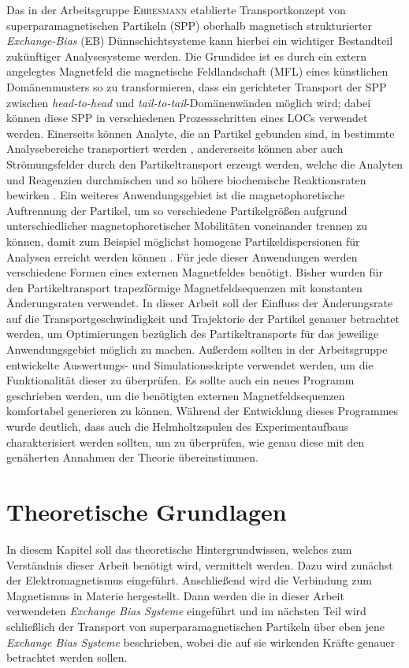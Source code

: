 \documentclass[page,pdftex,12pt,a4paper,twoside,openright]{scrbook}
\begin{document}
Das in der Arbeitsgruppe \textsc{Ehresmann} etablierte Transportkonzept von superparamagnetischen Partikeln (SPP) oberhalb magnetisch strukturierter \emph{Exchange-Bias} (EB) Dünnschichtsysteme kann hierbei ein wichtiger Bestandteil zukünftiger Analysesysteme werden. Die Grundidee ist es durch ein extern angelegtes Magnetfeld die magnetische Feldlandschaft (MFL) eines künstlichen Domänenmusters so zu transformieren, dass ein gerichteter Transport der SPP zwischen \emph{head-to-head} und \emph{tail-to-tail}-Domänenwänden möglich wird; dabei können diese SPP in verschiedenen Prozessschritten eines LOCs verwendet werden. Einerseits können Analyte, die an Partikel gebunden sind, in bestimmte Analysebereiche transportiert werden \cite{ehresmann_asymmetric_2011}, andererseits können aber auch Strömungsfelder durch den Partikeltransport erzeugt werden, welche die Analyten und Reagenzien durchmischen und so höhere biochemische Reaktionsraten bewirken \cite{holzinger_controlled_2012}. Ein weiteres Anwendungsgebiet ist die magnetophoretische Auftrennung der Partikel, um so verschiedene Partikelgrößen aufgrund unterschiedlicher magnetophoretischer Mobilitäten voneinander trennen zu können, damit zum Beispiel möglichst homogene Partikeldispersionen für Analysen erreicht werden können \cite{zhou_magnetic_2016}. Für jede dieser Anwendungen werden verschiedene Formen eines externen Magnetfeldes benötigt. Bisher wurden für den Partikeltransport trapezförmige Magnetfeldsequenzen mit konstanten Änderungsraten verwendet. In dieser Arbeit soll der Einfluss der Änderungsrate auf die Transportgeschwindigkeit und Trajektorie der Partikel genauer betrachtet werden, um Optimierungen bezüglich des Partikeltransports für das jeweilige Anwendungsgebiet möglich zu machen.
Außerdem sollten in der Arbeitsgruppe entwickelte Auswertungs-\cite{holzinger_pythonscript_nodate} und Simulationsskripte \cite{holzinger_pythonscript_nodate-1} verwendet werden, um die Funktionalität dieser zu überprüfen. Es sollte auch ein neues Programm geschrieben werden, um die benötigten externen Magnetfeldsequenzen komfortabel generieren zu können. Während der Entwicklung dieses Programmes wurde deutlich, dass auch die Helmholtzspulen des Experimentaufbaus charakterisiert werden sollten, um zu überprüfen, wie genau diese mit den genäherten Annahmen der Theorie übereinstimmen.

\chapter{Theoretische Grundlagen \label{sec-grundlagen}}
\label{sec:org1bf4a94}
In diesem Kapitel soll das theoretische Hintergrundwissen, welches zum Verständnis dieser Arbeit benötigt wird, vermittelt werden. Dazu wird zunächst der Elektromagnetismus eingeführt. Anschließend wird die Verbindung zum Magnetismus in Materie hergestellt. Dann werden die in dieser Arbeit verwendeten \emph{Exchange Bias Systeme} eingeführt und im nächsten Teil wird schließlich der Transport von superparamagnetischen Partikeln über eben jene \emph{Exchange Bias Systeme} beschrieben, wobei die auf sie wirkenden Kräfte genauer betrachtet werden sollen.
\end{document}
